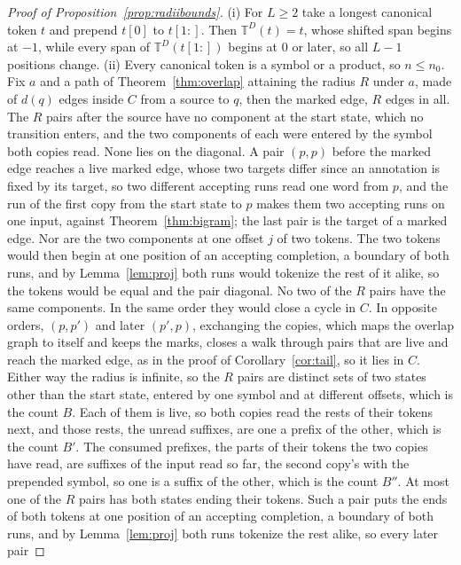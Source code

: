 \documentclass[11pt,a4paper]{article}
\theoremstyle{definition}
\theoremstyle{plain}
\newcommand{\T}{\mathbb{T}}
\begin{document}
\begin{proof}[Proof of Proposition~\ref{prop:radiibounds}]
(i) For \(L \ge 2\) take a longest canonical token \(t\) and prepend \(t[0]\) to \(t[1{:}]\). Then \(\T^D(t) = t\),
whose shifted span begins at \(-1\), while every span of \(\T^D(t[1{:}])\) begins at \(0\) or later, so all \(L - 1\)
positions change. (ii) Every canonical token is a symbol or a product, so \(n \le n_0\). Fix \(a\) and a path of
Theorem~\ref{thm:overlap} attaining the radius \(R\) under \(a\), made of \(d(q)\) edges inside \(C\) from a source to
\(q\), then the marked edge, \(R\) edges in all. The \(R\) pairs after the source have no component at the start state,
which no transition enters, and the two components of each were entered by the symbol both copies read. None lies on the
diagonal. A pair \((p, p)\) before the marked edge reaches a live marked edge, whose two targets differ since an
annotation is fixed by its target, so two different accepting runs read one word from \(p\), and the run of the first
copy from the start state to \(p\) makes them two accepting runs on one input, against Theorem~\ref{thm:bigram}; the
last pair is the target of a marked edge. Nor are the two components at one offset \(j\) of two tokens. The two tokens
would then begin at one position of an accepting completion, a boundary of both runs, and by Lemma~\ref{lem:proj} both
runs would tokenize the rest of it alike, so the tokens would be equal and the pair diagonal. No two of the \(R\) pairs
have the same components. In the same order they would close a cycle in \(C\). In opposite orders, \((p, p')\) and later
\((p', p)\), exchanging the copies, which maps the overlap graph to itself and keeps the marks, closes a walk through
pairs that are live and reach the marked edge, as in the proof of Corollary~\ref{cor:tail}, so it lies in \(C\). Either
way the radius is infinite, so the \(R\) pairs are distinct sets of two states other than the start state, entered by
one symbol and at different offsets, which is the count \(B\). Each of them is live, so both copies read the rests of
their tokens next, and those rests, the unread suffixes, are one a prefix of the other, which is the count \(B'\). The
consumed prefixes, the parts of their tokens the two copies have read, are suffixes of the input read so far, the second
copy's with the prepended symbol, so one is a suffix of the other, which is the count \(B''\). At most one of the \(R\)
pairs has both states ending their tokens. Such a pair puts the ends of both tokens at one position of an accepting
completion, a boundary of both runs, and by Lemma~\ref{lem:proj} both runs tokenize the rest alike, so every later pair

\end{proof}
\end{document}

